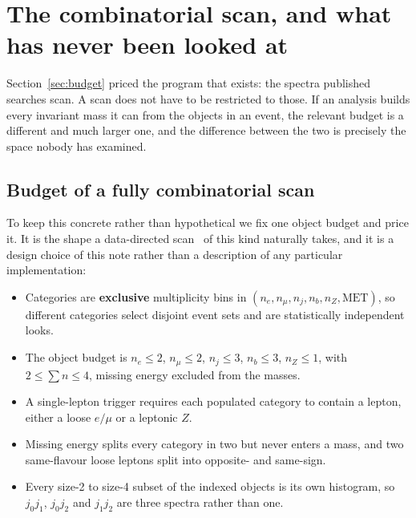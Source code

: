 \section{The combinatorial scan, and what has never been looked at}
\label{sec:combinatorial}

Section~\ref{sec:budget} priced the program that exists: the spectra published searches scan. A
scan does not have to be restricted to those. If an analysis builds every invariant mass it can
from the objects in an event, the relevant budget is a different and much larger one, and the
difference between the two is precisely the space nobody has examined.

\subsection{Budget of a fully combinatorial scan}

To keep this concrete rather than hypothetical we fix one object budget and price it. It is the
shape a data-directed scan~\cite{ddp} of this kind naturally takes, and it is a design choice of
this note rather than a description of any particular implementation:

\begin{itemize}[leftmargin=1.4em,itemsep=2pt]
  \item Categories are \textbf{exclusive} multiplicity bins in
        $(n_e, n_\mu, n_j, n_b, n_Z, \mathrm{MET})$, so different categories select disjoint event
        sets and are statistically independent looks.
  \item The object budget is $n_e \le 2$, $n_\mu \le 2$, $n_j \le 3$, $n_b \le 3$, $n_Z \le 1$,
        with $2 \le \sum n \le 4$, missing energy excluded from the masses.
  \item A single-lepton trigger requires each populated category to contain a lepton, either a
        loose $e/\mu$ or a leptonic $Z$.
  \item Missing energy splits every category in two but never enters a mass, and two same-flavour
        loose leptons split into opposite- and same-sign.
  \item Every size-2 to size-4 subset of the indexed objects is its own histogram, so $j_0j_1$,
        $j_0j_2$ and $j_1j_2$ are three spectra rather than one.
\end{itemize}

